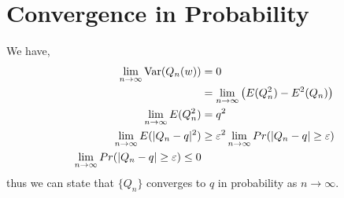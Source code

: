 \documentclass{article}
\begin{document}
\section{Convergence in Probability}
    We have, 
    \begin{align*}
        \lim_{n\to\infty}\text{Var}(Q_n(w)) &= 0
        \\
        &= \lim_{n\to\infty}\left(E(Q_n^2) - E^2(Q_n)\right)
        \\
        \lim_{n\to\infty} E(Q_n^2) &= q^2
        \\
        \lim_{n\to\infty}E(|Q_n - q|^2) &\ge
        \varepsilon^2\lim_{n\to\infty}Pr(|Q_n - q| \ge \varepsilon)
        \\
        \lim_{n\to\infty}Pr(|Q_n - q| \ge \varepsilon) \le 0
    \end{align*}
    thus we can state that $\{Q_n\}$ converges to $q$ in probability as $n \to
    \infty$. 
\end{document}
